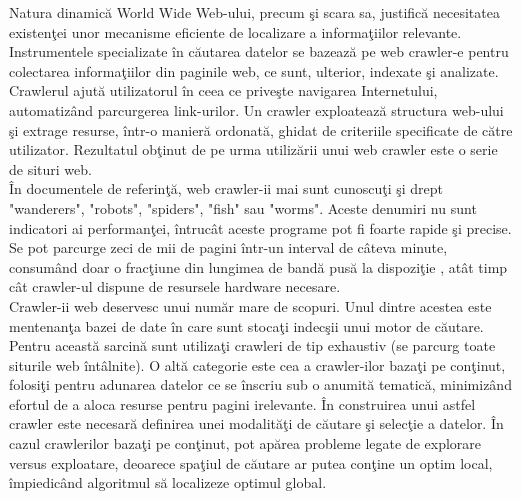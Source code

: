Natura dinamică World Wide Web-ului, precum şi scara sa, justifică necesitatea existenţei unor mecanisme eficiente de localizare a informaţiilor relevante. Instrumentele specializate în căutarea datelor se bazează pe web crawler-e pentru colectarea informaţiilor din paginile web, ce sunt, ulterior, indexate şi analizate.
\\ 

Crawlerul ajută utilizatorul în ceea ce priveşte navigarea Internetului, automatizând parcurgerea link-urilor. Un crawler exploatează structura web-ului şi extrage resurse, într-o manieră ordonată, ghidat de criteriile specificate de către utilizator. Rezultatul obţinut de pe urma utilizării unui web crawler este o serie de situri web.
\\

În documentele de referinţă, web crawler-ii mai sunt cunoscuţi şi drept "wanderers",  "robots", "spiders", "fish" sau "worms". Aceste denumiri nu sunt indicatori ai performanţei, întrucât aceste programe pot fi foarte rapide şi precise. Se pot parcurge zeci de mii de pagini într-un interval de câteva minute, consumând doar o fracţiune din lungimea de bandă pusă la dispoziţie \cite{GautamPadminiFilippo}, atât timp cât crawler-ul dispune de resursele hardware necesare.
\\ 

Crawler-ii web deservesc unui număr mare de scopuri. Unul dintre acestea este mentenanţa bazei de date în care sunt stocaţi indecşii unui motor de căutare. Pentru această sarcină sunt utilizaţi crawleri de tip exhaustiv (se parcurg toate siturile web întâlnite). O altă categorie este cea a crawler-ilor bazaţi pe conţinut, folosiţi pentru adunarea datelor ce se înscriu sub o anumită tematică, minimizând efortul de a aloca resurse pentru pagini irelevante. În construirea unui astfel crawler este necesară definirea unei modalităţi de căutare şi selecţie a datelor. În cazul crawlerilor bazaţi pe conţinut, pot apărea probleme legate de explorare versus exploatare, deoarece spaţiul de căutare ar putea conţine un optim local, împiedicând algoritmul să localizeze optimul global.\cite{PantSrinivasanMenczer} 
\\